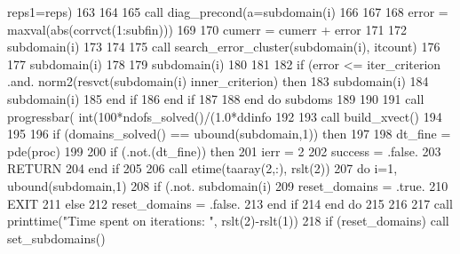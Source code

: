 \begin{DoxyCode}
{      reps1=reps)
163 
164               
165               \textcolor{keyword}{call }diag_precond(a=subdomain(i)%
166               
167               
168               error = maxval(abs(corrvct(1:subfin)))
169               
170               cumerr = cumerr + error
171 
172               subdomain(i)%
173               
174 
175               \textcolor{keyword}{call }search_error_cluster(subdomain(i), itcount) 
176               
177               subdomain(i)%
178 
179               subdomain(i)%
180 
181               
182               \textcolor{keywordflow}{if} (error <= iter_criterion .and. norm2(resvct(subdomain(i)%
      inner_criterion) \textcolor{keywordflow}{then} 
183                 subdomain(i)%
184                 subdomain(i)%
185 \textcolor{keywordflow}{              end if}
186 \textcolor{keywordflow}{            end if}
187                                         
188 \textcolor{keywordflow}{          end do} subdoms
189           
190                     
191           \textcolor{keyword}{call }progressbar( int(100*ndofs_solved()/(1.0*ddinfo%
192 
193           \textcolor{keyword}{call }build_xvect()
194           
195 
196           \textcolor{keywordflow}{if} (domains_solved() == ubound(subdomain,1)) \textcolor{keywordflow}{then}
197             
198             dt\_fine = pde(proc)%
199             
200             \textcolor{keywordflow}{if} (.not.(dt\_fine)) \textcolor{keywordflow}{then}
201               ierr = 2
202               success = .false.
203               \textcolor{keywordflow}{RETURN}
204 \textcolor{keywordflow}{            end if}
205             
206             \textcolor{keyword}{call }etime(taaray(2,:), rslt(2))
207             \textcolor{keywordflow}{do} i=1, ubound(subdomain,1)
208               \textcolor{keywordflow}{if} (.not. subdomain(i)%
209                 reset\_domains = .true.
210                 \textcolor{keywordflow}{EXIT}
211               \textcolor{keywordflow}{else}
212                 reset\_domains = .false.
213 \textcolor{keywordflow}{              end if}
214 \textcolor{keywordflow}{            end do}
215 
216            
217             \textcolor{keyword}{call }printtime(\textcolor{stringliteral}{"Time spent on iterations: "}, rslt(2)-rslt(1))
218             \textcolor{keywordflow}{if} (reset\_domains) \textcolor{keyword}{call }set_subdomains()
}
\end{DoxyCode}
